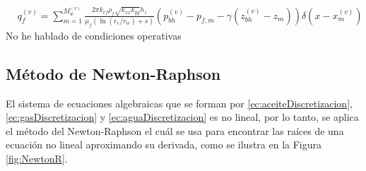 \begin{align}
	\label{ec:peaceman}&q^{(v)}_{f} = \sum_{m=1}^{M^{(v)}_{w}}\frac{2\pi k_{rf} \rho_{f} \sqrt{k_{xx}k_{yy}}h_{z}}{\mu_{f}\left(\ln \left(r_{e}/r_{w}\right) +s\right)}\left(p_{bh}^{(v)}-p_{f,m}-\gamma\left(z_{bh}^{(v)}-z_{m}\right)\right)\delta\left(x-x_{m}^{(v)}\right)
\end{align}
%
{\color{red} No he hablado de condiciones operativas}

\subsection{Método de Newton-Raphson}\label{subsec:N-R}
%
El sistema de ecuaciones algebraicas que se forman por \ref{ec:aceiteDiscretizacion}, \ref{ec:gasDiscretizacion} y \ref{ec:aguaDiscretizacion} es no lineal, por lo tanto, se aplica el método del Newton-Raphson el cuál se usa para encontrar las raíces de una ecuación no lineal aproximando su derivada, como se ilustra en la Figura \ref{fig:NewtonR}.\\

